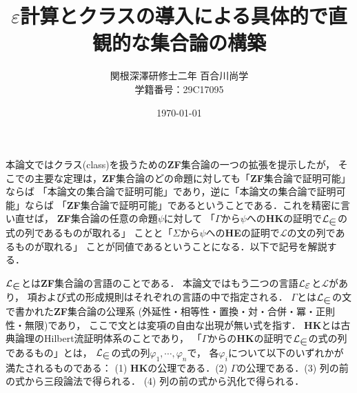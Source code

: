 \documentclass[twocolumn,10pt]{jsarticle}
\title{\vspace{-3cm}$\varepsilon$計算とクラスの導入による具体的で直観的な集合論の構築}
\author{関根深澤研修士二年 百合川尚学 \\ 学籍番号：29C17095}
\date{\today}
\theoremstyle{mystyle}
\newcommand{\lang}[1]{\mathcal{L}_{\scalebox{1.2}{$#1$}}} %
\begin{document}
\maketitle
	本論文ではクラス(class)を扱うための{\bf ZF}集合論の一つの拡張を提示したが，
	そこでの主要な定理は，{\bf ZF}集合論のどの命題に対しても「{\bf ZF}集合論で証明可能」ならば
	「本論文の集合論で証明可能」であり，逆に「本論文の集合論で証明可能」ならば
	「{\bf ZF}集合論で証明可能」であるということである．これを精密に言い直せば，
	{\bf ZF}集合論の任意の命題$\psi$に対して
	「$\Gamma$から$\psi$への{\bf HK}の証明で$\lang{\in}$の式の列であるものが取れる」
	ことと「$\Sigma$から$\psi$への{\bf HE}の証明で$\mathcal{L}$の文の列であるものが取れる」
	ことが同値であるということになる．以下で記号を解説する．
	
	$\lang{\in}$とは{\bf ZF}集合論の言語のことである．
	本論文ではもう二つの言語$\lang{\varepsilon}$と$\mathcal{L}$があり，
	項および式の形成規則はそれぞれの言語の中で指定される．
	$\Gamma$とは$\lang{\in}$の文で書かれた{\bf ZF}集合論の公理系
	(外延性・相等性・置換・対・合併・冪・正則性・無限)であり，
	ここで文とは変項の自由な出現が無い式を指す．
	{\bf HK}とは古典論理のHilbert流証明体系のことであり，
	「$\Gamma$からの{\bf HK}の証明で$\lang{\in}$の式の列であるもの」とは，
	$\lang{\in}$の式の列$\varphi_{1},\cdots,\varphi_{n}$で，
	各$\varphi_{i}$について以下のいずれかが満たされるものである：
	(1) {\bf HK}の公理である．(2) $\Gamma$の公理である．(3) 列の前の式から三段論法で得られる．
	(4) 列の前の式から汎化で得られる．
	
\end{document}
